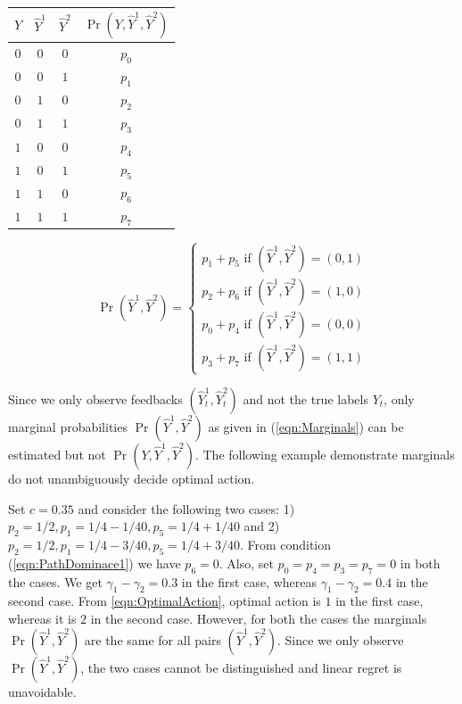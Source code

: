 \documentclass{article}
\begin{document}
\begin{minipage}{0.5\textwidth}
	\vspace{.5cm}
	\begin{tabular}[c]{ c|c|c|c } 
		\label{tab:SensorOutcomes}
		$Y$ & $\hat{Y}^1$ & $\hat{Y}^2$ & $\Pr(Y, \hat{Y}^1, \hat{Y}^2)$ \\ \hline 
		$0$ & $0$ & $0$ & $p_0$ \\  \hline
		$0$ & $0$ & $1$ & $p_1$ \\  \hline
		$0$ & $1$ & $0$ & $p_2$ \\  \hline
		$0$ & $1$ & $1$ & $p_3$ \\  \hline
		$1$ & $0$ & $0$ & $p_4$ \\  \hline
		$1$ & $0$ & $1$ & $p_5$ \\  \hline
		$1$ & $1$ & $0$ & $p_6$ \\  \hline
		$1$ & $1$ & $1$ & $p_7$ \\  \hline
		
	\end{tabular}
		\vspace{.5cm}
\end{minipage}\hspace{-1.5cm}
\begin{minipage}[c]{0.6\textwidth}
		\vspace{.5cm}
		\centering
	\hspace{-5cm}		
\begin{equation}
\label{eqn:Marginals}
\Pr(\hat{Y}^1, \hat{Y}^2)=
\begin{cases}
p_1 + p_5 \mbox{  if } (\hat{Y}^1, \hat{Y}^2)=(0,1)\\
p_2 + p_6 \mbox{  if } (\hat{Y}^1, \hat{Y}^2)=(1,0)\\
p_0 + p_4 \mbox{  if } (\hat{Y}^1, \hat{Y}^2)=(0,0)\\
p_3 + p_7 \mbox{  if } (\hat{Y}^1, \hat{Y}^2)=(1,1)
\end{cases}
\end{equation}
	\vspace{.5cm}
\end{minipage}

\noindent
Since we only observe feedbacks $(\hat{Y}_t^1, \hat{Y}_t^2)$ and not the true labels $Y_t$, only marginal probabilities $\Pr(\hat{Y}^1, \hat{Y}^2)$ as given in (\ref{eqn:Marginals}) can be estimated but not $\Pr(Y, \hat{Y}^1, \hat{Y}^2)$. The following example demonstrate  marginals do not unambiguously decide optimal action.

Set $c=0.35$ and consider the following two cases: 1) $p_2=1/2, p_1=1/4-1/40, p_5=1/4+1/40$ and 2) $p_2=1/2, p_1=1/4-3/40,p_5=1/4+3/40$. From condition (\ref{eqn:PathDominace1}) we have $p_6=0$. Also, set $p_0=p_4=p_3=p_7=0$ in both the cases. We get $\gamma_1-\gamma_2=0.3$ in the first case,  whereas $\gamma_1-\gamma_2=0.4$ in the second case. From \ref{eqn:OptimalAction}, optimal action is $1$ in the first case, whereas it is  $2$ in the second case. However, for both the cases the marginals $\Pr(\hat{Y}^1, \hat{Y}^2)$ are the same for all pairs $(\hat{Y}^1, \hat{Y}^2)$. Since we only  observe $\Pr(\hat{Y}^1, \hat{Y}^2)$, the two cases cannot be distinguished and linear regret is unavoidable. 
\end{document}

